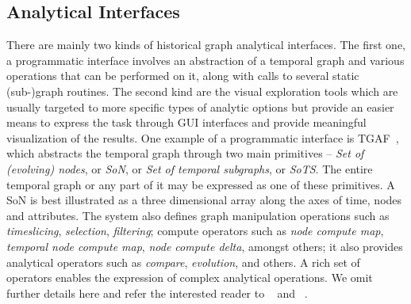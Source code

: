 \documentclass{svjour3}
\begin{document}



\subsection{Analytical Interfaces}
There are mainly two kinds of historical graph analytical interfaces. The first one, a programmatic interface involves an abstraction of a temporal graph and various operations that can be performed on it, along with calls to several static (sub-)graph routines. The second kind are the visual exploration tools which are usually targeted to more specific types of analytic options but provide an easier means to express the task through GUI interfaces and provide meaningful visualization of the results. One example of a programmatic interface is TGAF~\cite{khurana2016storing}, which abstracts the temporal graph through two main primitives --  {\em Set of (evolving) nodes}, or {\em SoN}, or {\em Set of temporal subgraphs}, or {\em SoTS}. The entire temporal graph or any part of it may be expressed as one of these primitives. A SoN is best illustrated as a three dimensional array along the axes of time, nodes and attributes. The system also defines graph manipulation operations such as {\em timeslicing}, {\em selection}, {\em filtering}; compute operators such as {\em node compute map}, {\em temporal node compute map}, {\em node compute delta}, amongst others; it also provides analytical operators such as {\em compare}, {\em evolution}, and others. A rich set of operators enables the expression of complex analytical operations. We omit further details here and refer the interested reader to ~\cite{khurana2016storing} and ~\cite{khurana2015historical}.
\end{document}
